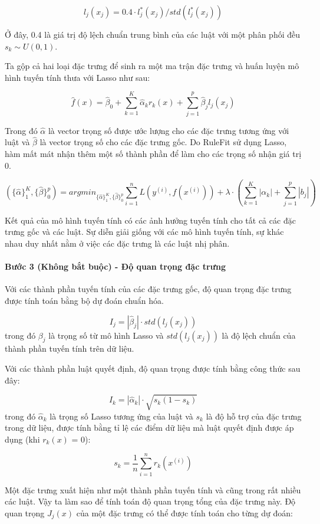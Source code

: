 $$l_j(x_j)=0.4\cdot{}l^*_j(x_j)/std(l^*_j(x_j))$$

Ở đây, 0.4 là giá trị độ lệch chuẩn trung bình của các luật với một phân phối đều $s_k\sim{}U(0,1)$.

Ta gộp cả hai loại đặc trưng để sinh ra một ma trận đặc trưng và huấn luyện mô hình tuyến tính thưa với Lasso như sau:

$$\hat{f}(x)=\hat{\beta}_0+\sum_{k=1}^K\hat{\alpha}_k{}r_k(x)+\sum_{j=1}^p\hat{\beta}_j{}l_j(x_j)$$

Trong đó $\hat{\alpha}$ là vector trọng số được ước lượng cho các đặc trưng tương ứng với luật và $\hat{\beta}$ là vector trọng số cho các đặc trưng gốc. Do RuleFit sử dụng Lasso, hàm mất mát nhận thêm một số thành phần để làm cho các trọng số nhận giá trị 0.

$$(\{\hat{\alpha}\}_1^K,\{\hat{\beta}\}_0^p)=argmin_{\{\hat{\alpha}\}_1^K,\{\hat{\beta}\}_0^p}\sum_{i=1}^n{}L(y^{(i)},f(x^{(i)}))+\lambda\cdot\left(\sum_{k=1}^K|\alpha_k|+\sum_{j=1}^p|b_j|\right)$$

Kết quả của mô hình tuyến tính có các ảnh hưởng tuyến tính cho tất cả các đặc trưng gốc và các luật. Sự diễn giải giống với các mô hình tuyến tính, sự khác nhau duy nhất nằm ở việc các đặc trưng là các luật nhị phân.

\paragraph{Bước 3 (Không bắt buộc) - Độ quan trọng đặc trưng}

Với các thành phần tuyến tính của các đặc trưng gốc, độ quan trọng đặc trưng được tính toán bằng bộ dự đoán chuẩn hóa.

$$I_j=|\hat{\beta}_j|\cdot{}std(l_j(x_j))$$
trong đó $\beta_j$ là trọng số từ mô hình Lasso và $std(l_j(x_j))$ là độ lệch chuẩn của thành phần tuyến tính trên dữ liệu.

Với các thành phần luật quyết định, độ quan trọng được tính bằng công thức sau đây:

$$I_k=|\hat{\alpha}_k|\cdot\sqrt{s_k(1-s_k)}$$
trong đó $\hat{\alpha}_k$ là trọng số Lasso tương ứng của luật và $s_k$ là độ hỗ trợ của đặc trưng trong dữ liệu, được tính bằng tỉ lệ các điểm dữ liệu mà luật quyết định được áp dụng (khi $r_k(x)$ = 0):

$$s_k=\frac{1}{n}\sum_{i=1}^n{}r_k(x^{(i)})$$

Một đặc trưng xuất hiện như một thành phần tuyến tính và cũng trong rất nhiều các luật. Vậy ta làm sao để tính toán độ quan trọng tổng của đặc trưng này. Độ quan trọng $J_j(x)$ của một đặc trưng có thể được tính toán cho từng dự đoán:

